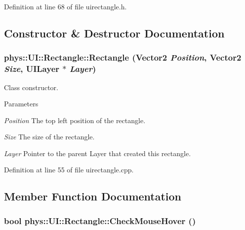 Definition at line 68 of file uirectangle.h.



\subsection{Constructor \& Destructor Documentation}
\hypertarget{classphys_1_1UI_1_1Rectangle_af934bcacaa658b2d15e4b7c9ba1bc225}{
\subsubsection[{Rectangle}]{\setlength{\rightskip}{0pt plus 5cm}phys::UI::Rectangle::Rectangle ({\bf Vector2} {\em Position}, \/  {\bf Vector2} {\em Size}, \/  {\bf UILayer} $\ast$ {\em Layer})}}
\label{d1/d5d/classphys_1_1UI_1_1Rectangle_af934bcacaa658b2d15e4b7c9ba1bc225}


Class constructor. 


\begin{DoxyParams}{Parameters}
\item[{\em Position}]The top left position of the rectangle. \item[{\em Size}]The size of the rectangle. \item[{\em Layer}]Pointer to the parent Layer that created this rectangle. \end{DoxyParams}


Definition at line 55 of file uirectangle.cpp.



\subsection{Member Function Documentation}
\hypertarget{classphys_1_1UI_1_1Rectangle_a246070a93416c2c50d63720b354154d7}{
\subsubsection[{CheckMouseHover}]{\setlength{\rightskip}{0pt plus 5cm}bool phys::UI::Rectangle::CheckMouseHover ()}}
\label{d1/d5d/classphys_1_1UI_1_1Rectangle_a246070a93416c2c50d63720b354154d7}


